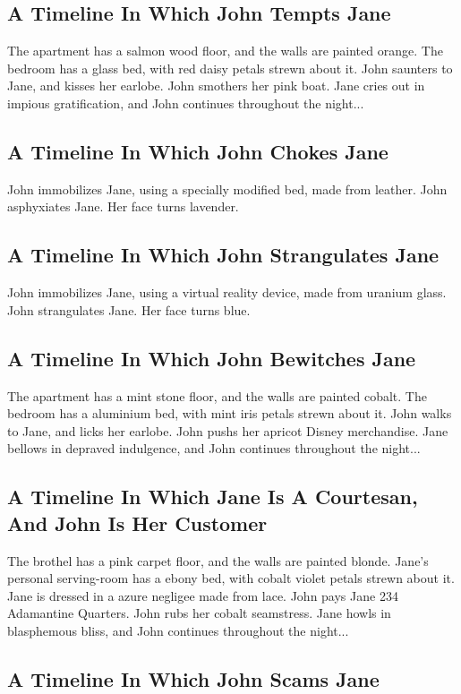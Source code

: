 \documentclass{article}
\begin{document}
\subsection{A Timeline In Which John Tempts Jane}


The apartment has a salmon wood floor, and the walls are painted orange.
The bedroom has a glass bed, with red daisy petals strewn about it.
John saunters to Jane, and kisses her earlobe.
John smothers her pink boat.
Jane cries out in impious gratification, and John continues throughout the night...
\subsection{A Timeline In Which John Chokes Jane}


John immobilizes Jane, using a specially modified bed, made from leather.
John asphyxiates Jane.
Her face turns lavender.
\subsection{A Timeline In Which John Strangulates Jane}


John immobilizes Jane, using a virtual reality device, made from uranium glass.
John strangulates Jane.
Her face turns blue.
\subsection{A Timeline In Which John Bewitches Jane}


The apartment has a mint stone floor, and the walls are painted cobalt.
The bedroom has a aluminium bed, with mint iris petals strewn about it.
John walks to Jane, and licks her earlobe.
John pushs her apricot Disney merchandise.
Jane bellows in depraved indulgence, and John continues throughout the night...
\subsection{A Timeline In Which Jane Is A Courtesan, And John Is Her Customer}


The brothel has a pink carpet floor, and the walls are painted blonde.
Jane's personal serving{-}room has a ebony bed, with cobalt violet petals strewn about it.
Jane is dressed in a azure negligee made from lace.
John pays Jane 234 Adamantine Quarters.
John rubs her cobalt seamstress.
Jane howls in blasphemous bliss, and John continues throughout the night...
\subsection{A Timeline In Which John Scams Jane}
\end{document}

